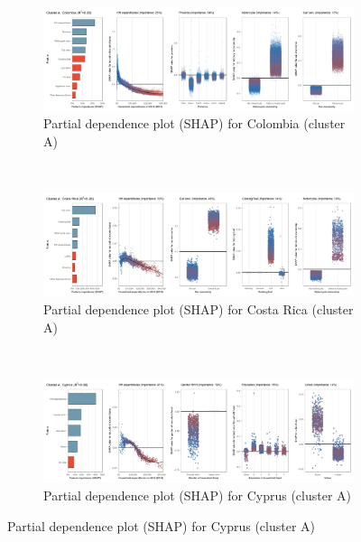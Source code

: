\begin{figure}[ht!]\ContinuedFloat
    \centering
   \begin{subfigure}[b]{\textwidth}
         \centering
         \caption{Partial dependence plot (SHAP) for Colombia (cluster A)}
         \label{fig:5b_COL}
         \includegraphics[width=\textwidth]{Figure 5b/Figure_5b_COL}
         \end{subfigure}
    \\
    \vspace{0.5cm}
   \begin{subfigure}[b]{\textwidth}
      \centering
      \caption{Partial dependence plot (SHAP) for Costa Rica (cluster A)}
      \label{fig:5b_CRI}
      \includegraphics[width=\textwidth]{Figure 5b/Figure_5b_CRI}       
     \end{subfigure}
    \\
    \vspace{0.5cm}
   \begin{subfigure}[b]{\textwidth}
         \centering
         \caption{Partial dependence plot (SHAP) for Cyprus (cluster A)}
         \label{fig:5b_CYP}
         \includegraphics[width=\textwidth]{Figure 5b/Figure_5b_CYP}

\end{subfigure}
\end{figure}

